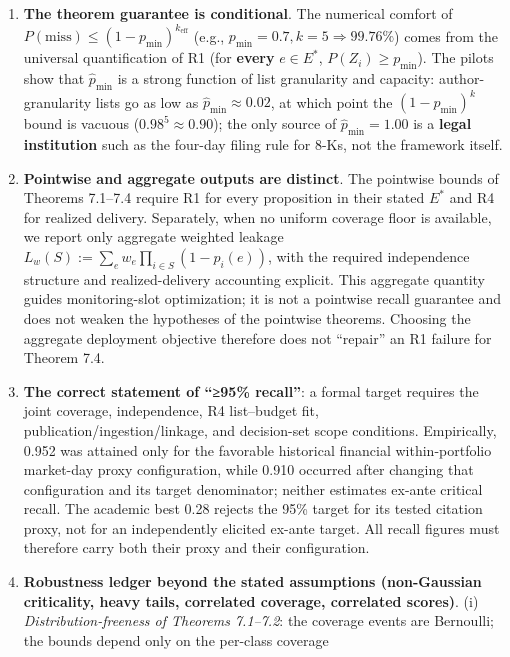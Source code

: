 \documentclass[
  11pt]{article}
\providecommand{\tightlist}{%
  \setlength{\itemsep}{0pt}\setlength{\parskip}{0pt}}
\begin{document}
\begin{enumerate}
\def\labelenumi{\arabic{enumi}.}
\tightlist
\item
  \textbf{The theorem guarantee is conditional}. The numerical comfort
  of \(P(\mathrm{miss}) \le (1-p_{\min})^{k_{\mathrm{eff}}}\) (e.g.,
  \(p_{\min}=0.7, k=5 \Rightarrow 99.76\%\)) comes from the universal
  quantification of R1 (for \textbf{every} \(e \in E^*\),
  \(P(Z_i)\ge p_{\min}\)). The pilots show that \(\hat p_{\min}\) is a
  strong function of list granularity and capacity: author-granularity
  lists go as low as \(\hat p_{\min}\approx0.02\), at which point the
  \((1-\hat p_{\min})^k\) bound is vacuous (\(0.98^5\approx0.90\)); the
  only source of \(\hat p_{\min}=1.00\) is a \textbf{legal institution}
  such as the four-day filing rule for 8-Ks, not the framework itself.
\item
  \textbf{Pointwise and aggregate outputs are distinct}. The pointwise
  bounds of Theorems 7.1--7.4 require R1 for every proposition in their
  stated \(E^*\) and R4 for realized delivery. Separately, when no
  uniform coverage floor is available, we report only aggregate weighted
  leakage \(L_w(S):=\sum_ew_e\prod_{i\in S}(1-p_i(e))\), with the
  required independence structure and realized-delivery accounting
  explicit. This aggregate quantity guides monitoring-slot optimization;
  it is not a pointwise recall guarantee and does not weaken the
  hypotheses of the pointwise theorems. Choosing the aggregate
  deployment objective therefore does not ``repair'' an R1 failure for
  Theorem 7.4.
\item
  \textbf{The correct statement of ``≥95\% recall''}: a formal target
  requires the joint coverage, independence, R4 list--budget fit,
  publication/ingestion/linkage, and decision-set scope conditions.
  Empirically, 0.952 was attained only for the favorable historical
  financial within-portfolio market-day proxy configuration, while 0.910
  occurred after changing that configuration and its target denominator;
  neither estimates ex-ante critical recall. The academic best 0.28
  rejects the 95\% target for its tested citation proxy, not for an
  independently elicited ex-ante target. All recall figures must
  therefore carry both their proxy and their configuration.
\item
  \textbf{Robustness ledger beyond the stated assumptions (non-Gaussian
  criticality, heavy tails, correlated coverage, correlated scores)}.
  (i) \emph{Distribution-freeness of Theorems 7.1--7.2}: the coverage
  events are Bernoulli; the bounds depend only on the per-class coverage

\end{enumerate}
\end{document}

